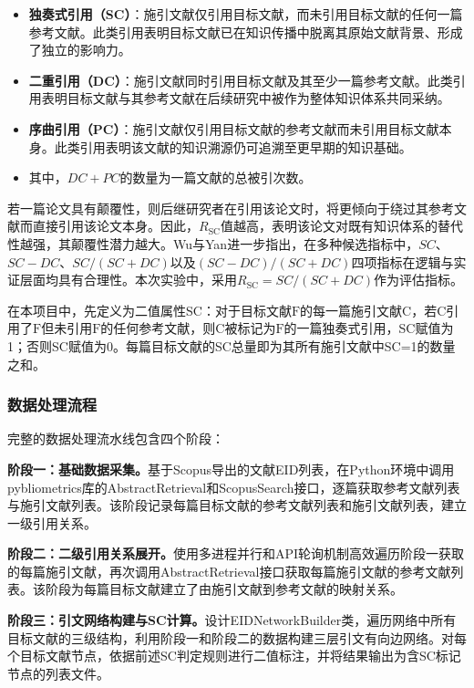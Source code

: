 \documentclass[12pt,hyperref,a4paper,UTF8]{ctexart}
\begin{document}
        \begin{itemize}
            \item \textbf{独奏式引用（SC）}：施引文献仅引用目标文献，而未引用目标文献的任何一篇参考文献。此类引用表明目标文献已在知识传播中脱离其原始文献背景、形成了独立的影响力。
            \item \textbf{二重引用（DC）}：施引文献同时引用目标文献及其至少一篇参考文献。此类引用表明目标文献与其参考文献在后续研究中被作为整体知识体系共同采纳。
            \item \textbf{序曲引用（PC）}：施引文献仅引用目标文献的参考文献而未引用目标文献本身。此类引用表明该文献的知识溯源仍可追溯至更早期的知识基础。
            \item 其中，$DC+PC$的数量为一篇文献的总被引次数。
        \end{itemize}

        若一篇论文具有颠覆性，则后继研究者在引用该论文时，将更倾向于绕过其参考文献而直接引用该论文本身。因此，$R_{\mathrm{SC}}$值越高，表明该论文对既有知识体系的替代性越强，其颠覆性潜力越大。Wu与Yan进一步指出，在多种候选指标中，$SC$、$SC-DC$、$SC/(SC+DC)$以及$(SC-DC)/(SC+DC)$四项指标在逻辑与实证层面均具有合理性。本次实验中，采用$R_{\mathrm{SC}}=SC/(SC+DC)$作为评估指标。

        在本项目中，先定义为二值属性SC：对于目标文献$\text{F}$的每一篇施引文献$\text{C}$，若$\text{C}$引用了$\text{F}$但未引用$\text{F}$的任何参考文献，则$\text{C}$被标记为$\text{F}$的一篇独奏式引用，SC赋值为1；否则SC赋值为0。每篇目标文献的SC总量即为其所有施引文献中SC=1的数量之和。

        \subsubsection{数据处理流程}

        完整的数据处理流水线包含四个阶段：

            \textbf{阶段一：基础数据采集。}基于Scopus导出的文献EID列表，在Python环境中调用pybliometrics库的AbstractRetrieval和ScopusSearch接口，逐篇获取参考文献列表与施引文献列表。该阶段记录每篇目标文献的参考文献列表和施引文献列表，建立一级引用关系。

            \textbf{阶段二：二级引用关系展开。}使用多进程并行和API轮询机制高效遍历阶段一获取的每篇施引文献，再次调用AbstractRetrieval接口获取每篇施引文献的参考文献列表。该阶段为每篇目标文献建立了由施引文献到参考文献的映射关系。

            \textbf{阶段三：引文网络构建与SC计算。}设计EIDNetworkBuilder类，遍历网络中所有目标文献的三级结构，利用阶段一和阶段二的数据构建三层引文有向边网络。对每个目标文献节点，依据前述SC判定规则进行二值标注，并将结果输出为含SC标记节点的列表文件。
\end{document}

